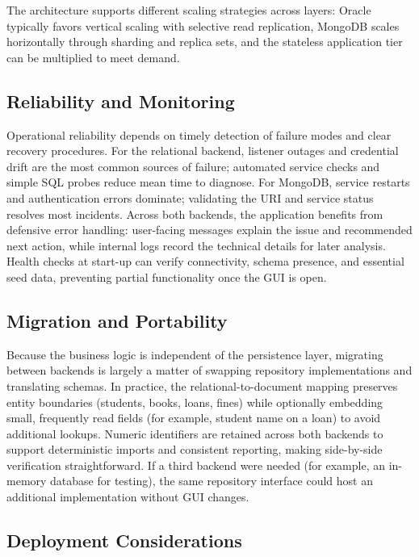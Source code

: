 \documentclass[12pt,a4paper]{article}
\begin{document}
The architecture supports different scaling strategies across layers: Oracle typically favors vertical scaling with selective read replication, MongoDB scales horizontally through sharding and replica sets, and the stateless application tier can be multiplied to meet demand.

\subsection{Reliability and Monitoring}

Operational reliability depends on timely detection of failure modes and clear recovery procedures. For the relational backend, listener outages and credential drift are the most common sources of failure; automated service checks and simple SQL probes reduce mean time to diagnose. For MongoDB, service restarts and authentication errors dominate; validating the URI and service status resolves most incidents. Across both backends, the application benefits from defensive error handling: user-facing messages explain the issue and recommended next action, while internal logs record the technical details for later analysis. Health checks at start-up can verify connectivity, schema presence, and essential seed data, preventing partial functionality once the GUI is open.

\subsection{Migration and Portability}

Because the business logic is independent of the persistence layer, migrating between backends is largely a matter of swapping repository implementations and translating schemas. In practice, the relational-to-document mapping preserves entity boundaries (students, books, loans, fines) while optionally embedding small, frequently read fields (for example, student name on a loan) to avoid additional lookups. Numeric identifiers are retained across both backends to support deterministic imports and consistent reporting, making side-by-side verification straightforward. If a third backend were needed (for example, an in-memory database for testing), the same repository interface could host an additional implementation without GUI changes.

\subsection{Deployment Considerations}
\end{document}
